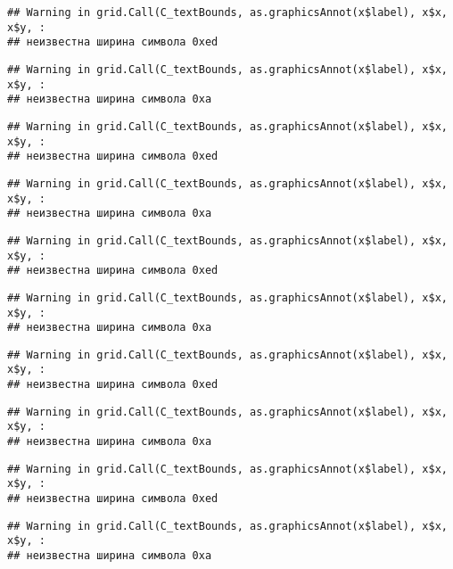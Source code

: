 \documentclass[
]{article}
\begin{document}
\begin{verbatim}
## Warning in grid.Call(C_textBounds, as.graphicsAnnot(x$label), x$x, x$y, :
## неизвестна ширина символа 0xed
\end{verbatim}

\begin{verbatim}
## Warning in grid.Call(C_textBounds, as.graphicsAnnot(x$label), x$x, x$y, :
## неизвестна ширина символа 0xa
\end{verbatim}

\begin{verbatim}
## Warning in grid.Call(C_textBounds, as.graphicsAnnot(x$label), x$x, x$y, :
## неизвестна ширина символа 0xed
\end{verbatim}

\begin{verbatim}
## Warning in grid.Call(C_textBounds, as.graphicsAnnot(x$label), x$x, x$y, :
## неизвестна ширина символа 0xa
\end{verbatim}

\begin{verbatim}
## Warning in grid.Call(C_textBounds, as.graphicsAnnot(x$label), x$x, x$y, :
## неизвестна ширина символа 0xed
\end{verbatim}

\begin{verbatim}
## Warning in grid.Call(C_textBounds, as.graphicsAnnot(x$label), x$x, x$y, :
## неизвестна ширина символа 0xa
\end{verbatim}

\begin{verbatim}
## Warning in grid.Call(C_textBounds, as.graphicsAnnot(x$label), x$x, x$y, :
## неизвестна ширина символа 0xed
\end{verbatim}

\begin{verbatim}
## Warning in grid.Call(C_textBounds, as.graphicsAnnot(x$label), x$x, x$y, :
## неизвестна ширина символа 0xa
\end{verbatim}

\begin{verbatim}
## Warning in grid.Call(C_textBounds, as.graphicsAnnot(x$label), x$x, x$y, :
## неизвестна ширина символа 0xed
\end{verbatim}

\begin{verbatim}
## Warning in grid.Call(C_textBounds, as.graphicsAnnot(x$label), x$x, x$y, :
## неизвестна ширина символа 0xa
\end{verbatim}
\end{document}
